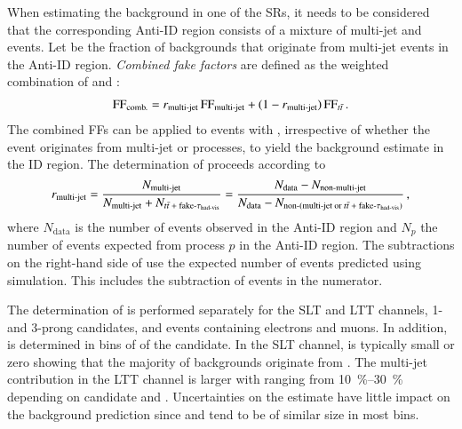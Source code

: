 When estimating the \faketauhadvisC background in one of the \lephad SRs, it
needs to be considered that the corresponding Anti-ID region consists of a
mixture of multi-jet and \ttbarFakes events. Let \rqcd be the fraction of
\faketauhadvisC backgrounds that originate from multi-jet events in the Anti-ID
region. \emph{Combined fake factors} are defined as the weighted combination of
\FFqcd and \FFttbar:
\begin{align*}
  \text{FF}_{\text{comb.}} = r_{\text{multi-jet}} \, \text{FF}_{\text{multi-jet}} + (1 - r_{\text{multi-jet}}) \, \text{FF}_{t\bar{t}} \,\text{.}
\end{align*}
The combined FFs can be applied to events with \faketauhadvis, irrespective of
whether the event originates from multi-jet or \ttbar processes, to yield the
background estimate in the ID region. The determination of \rqcd proceeds
according to
\begin{align}
  \rqcd =
  \frac{N_{\text{multi-jet}}}{N_{\text{multi-jet}} + N_{\text{\ttbarFakes}}}
  = \frac
  { N_{\text{data}} - N_{\text{non-multi-jet}} }
  { N_{\text{data}} - N_{\text{non-(multi-jet or \ttbarFakes)}} } \,\text{,}
  \label{eq:rqcd}
\end{align}
where $N_{\text{data}}$ is the number of events observed in the Anti-ID region
and $N_{p}$ the number of events expected from process $p$ in the Anti-ID
region. The subtractions on the right-hand side of  use the
expected number of events predicted using simulation. This includes the
subtraction of \ttbarFakes events in the numerator.

The determination of \rqcd is performed separately for the \lephad SLT and LTT
channels, 1- and 3-prong \tauhadvis candidates, and events containing electrons
and muons. In addition, \rqcd is determined in bins of \pT of the \tauhadvis
candidate. In the SLT channel, \rqcd is typically small or zero showing that the
majority of \faketauhadvisC backgrounds originate from \ttbar. The multi-jet
contribution in the LTT channel is larger with \rqcd ranging from
\SIrange{10}{30}{\percent} depending on \tauhadvis candidate \pT and
\Ntracks. Uncertainties on the \rqcd estimate have little impact on the
\faketauhadvisC background prediction since \FFqcd and \FFttbar tend to be of
similar size in most bins.

